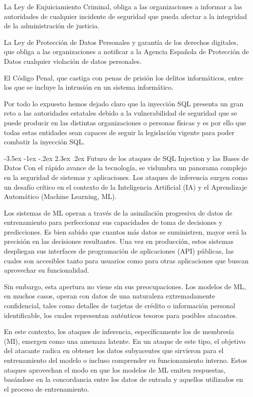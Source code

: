 \documentclass[11pt]{report}
\makeatletter
\renewcommand\chapter{\@startsection{chapter}{0}{\z@}%
    {-3.5ex \@plus -1ex \@minus -.2ex}%
    {2.3ex \@plus.2ex}%
    {\normalfont\Large\bfseries}}
\makeatother
\begin{document}
La Ley de Enjuiciamiento Criminal, obliga a las organizaciones a informar a las autoridades de cualquier incidente de seguridad que pueda afectar a la integridad
de la administración de justicia.

La Ley de Protección de Datos Personales y garantía de los derechos digitales, que obliga a las organizaciones a notificar a la Agencia Española de Protección de Datos cualquier violación
de datos personales.

El Código Penal, que castiga con penas de prisión los delitos informáticos, entre los que se incluye la intrusión en un sistema informático.

Por todo lo expuesto hemos dejado claro que la inyección SQL presenta un gran reto a las autoridades estatales debido a la vulnerabilidad de seguridad que se puede producir en
las distintas organizaciones o personas físicas y es por ello que todas estas entidades sean capaces de seguir la legislación vigente para poder combatir la inyección SQL.

\cleardoublepage

\chapter{Futuro de los ataques de SQL Injection y las Bases de Datos}
Con el rápido avance de la tecnología, se vislumbra un panorama complejo en la seguridad de sistemas y aplicaciones. Los ataques de inferencia surgen 
como un desafío crítico en el contexto de la Inteligencia Artificial (IA) y el Aprendizaje Automático (Machine Learning, ML).

Los sistemas de ML operan a través de la asimilación progresiva de datos de entrenamiento para perfeccionar sus capacidades de toma de decisiones y 
predicciones. Es bien sabido que cuantos más datos se suministren, mayor será la precisión en las decisiones resultantes. Una vez en producción, 
estos sistemas despliegan sus interfaces de programación de aplicaciones (API) públicas, las cuales son accesibles tanto para usuarios como para 
otras aplicaciones que buscan aprovechar su funcionalidad.
	
Sin embargo, esta apertura no viene sin sus preocupaciones. Los modelos de ML, en muchos casos, operan con datos de una naturaleza extremadamente
confidencial, tales como detalles de tarjetas de crédito o información personal identificable, los cuales representan auténticos tesoros para 
posibles atacantes.

En este contexto, los ataques de inferencia, específicamente los de membresía (MI), emergen como una amenaza latente. En un ataque de este tipo,
el objetivo del atacante radica en obtener los datos subyacentes que sirvieron para el entrenamiento del modelo o incluso comprender su funcionamiento
interno. Estos ataques aprovechan el modo en que los modelos de ML emiten respuestas, basándose en la concordancia entre los datos de entrada y aquellos
utilizados en el proceso de entrenamiento.
\end{document}

